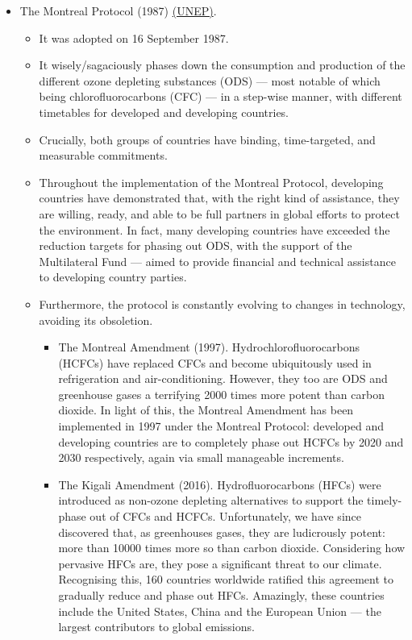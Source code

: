 \documentclass[oneside]{book}
\begin{document}
\begin{enumerate}
\begin{itemize}
\begin{itemize}
        \end{itemize}
        \item The Montreal Protocol (1987) \href{https://www.unep.org/ozonaction/who-we-are/about-montreal-protocol#:~:text=The%20Montreal%20Protocol&text=Adopted%20on%2016%20September%201987,treaties%20to%20achieve%20universal%20ratification.}{(UNEP)}.  
        \begin{itemize}
            \item It was adopted on 16 September 1987.
            \item It wisely/sagaciously phases down the consumption and production of the different ozone depleting substances (ODS) --- most notable of which being chlorofluorocarbons (CFC) --- in a step-wise manner, with different timetables for developed and developing countries.
            \item Crucially, both groups of countries have binding, time-targeted, and measurable commitments.
            \item Throughout the implementation of the Montreal Protocol, developing countries have demonstrated that, with the right kind of assistance, they are willing, ready, and able to be full partners in global efforts to protect the environment. In fact, many developing countries have exceeded the reduction targets for phasing out ODS, with the support of the Multilateral Fund --- aimed to provide financial and technical assistance to developing country parties.
            \item Furthermore, the protocol is constantly evolving to changes in technology, avoiding its obsoletion.
            \begin{itemize}
                \item The Montreal Amendment (1997). Hydrochlorofluorocarbons (HCFCs) have replaced CFCs and become ubiquitously used in refrigeration and air-conditioning. However, they too are ODS and greenhouse gases a terrifying 2000 times more potent than carbon dioxide. In light of this, the Montreal Amendment has been implemented in 1997 under the Montreal Protocol: developed and developing countries are to completely phase out HCFCs by 2020 and 2030 respectively, again via small manageable increments.
                \item The Kigali Amendment (2016). Hydrofluorocarbons (HFCs) were introduced as non-ozone depleting alternatives to support the timely-phase out of CFCs and HCFCs. Unfortunately, we have since discovered that, as greenhouses gases, they are ludicrously potent: more than 10000 times more so than carbon dioxide. Considering how pervasive HFCs are, they pose a significant threat to our climate. Recognising this, 160 countries worldwide ratified this agreement to gradually reduce and phase out HFCs. Amazingly, these countries include the United States, China and the European Union --- the largest contributors to global emissions. 

\end{itemize}
\end{itemize}
\end{itemize}
\end{enumerate}
\end{document}
